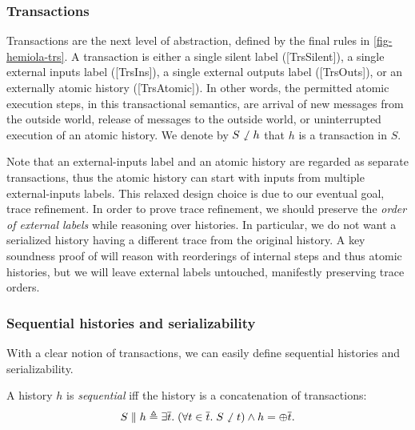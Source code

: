 \documentclass[sigplan,10pt,review,anonymous,screen]{acmart}\settopmatter{printfolios=true,printccs=false,printacmref=false}
\begin{document}
\subsubsection{Transactions}
Transactions are the next level of abstraction, defined by the final rules in \autoref{fig-hemiola-trs}.
A transaction is either a single silent label ([TrsSilent]), a single external inputs label ([TrsIns]), a single external outputs label ([TrsOuts]), or an externally atomic history ([TrsAtomic]).
In other words, the permitted atomic execution steps, in this transactional semantics, are arrival of new messages from the outside world, release of messages to the outside world, or uninterrupted execution of an atomic history.
We denote by $S \sswarrow h$ that $h$ is a transaction in $S$.

Note that an external-inputs label and an atomic history are regarded as separate transactions, thus the atomic history can start with inputs from multiple external-inputs labels.
This relaxed design choice is due to our eventual goal, trace refinement.
In order to prove trace refinement, we should preserve the \emph{order of external labels} while reasoning over histories.
In particular, we do not want a serialized history having a different trace from the original history.
A key soundness proof of \hemiola{} will reason with reorderings of internal steps and thus atomic histories, but we will leave external labels untouched, manifestly preserving trace orders.

\subsubsection{Sequential histories and serializability}
With a clear notion of transactions, we can easily define sequential histories and serializability.

\begin{definition}
  A history $h$ is \emph{sequential} iff the history is a concatenation of
  transactions:
  \begin{displaymath}
    S \parallel h \triangleq \exists \overline{t}.\; (\forall t \in \overline{t}.\; S \sswarrow t) \wedge h = \oplus \overline{t}.
  \end{displaymath}
  \label{def-seq}
\end{definition}
\end{document}
